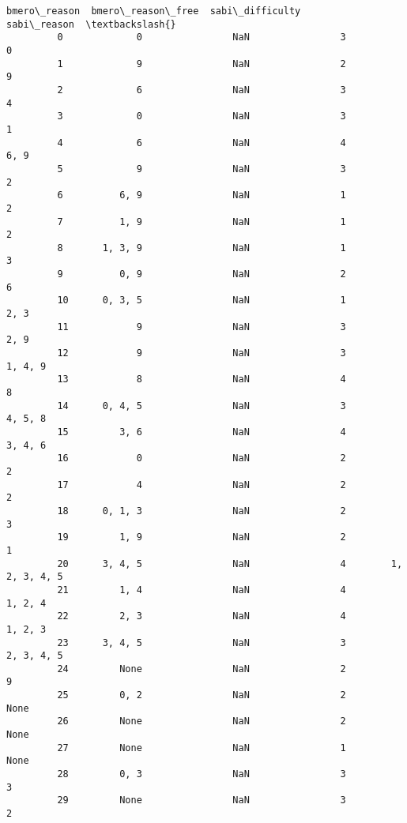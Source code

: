 \documentclass[11pt]{article}
\begin{document}
\begin{Verbatim}[commandchars=\\\{\}]
            bmero\_reason  bmero\_reason\_free  sabi\_difficulty          sabi\_reason  \textbackslash{}
         0             0                NaN                3                    0   
         1             9                NaN                2                    9   
         2             6                NaN                3                    4   
         3             0                NaN                3                    1   
         4             6                NaN                4                 6, 9   
         5             9                NaN                3                    2   
         6          6, 9                NaN                1                    2   
         7          1, 9                NaN                1                    2   
         8       1, 3, 9                NaN                1                    3   
         9          0, 9                NaN                2                    6   
         10      0, 3, 5                NaN                1                 2, 3   
         11            9                NaN                3                 2, 9   
         12            9                NaN                3              1, 4, 9   
         13            8                NaN                4                    8   
         14      0, 4, 5                NaN                3              4, 5, 8   
         15         3, 6                NaN                4              3, 4, 6   
         16            0                NaN                2                    2   
         17            4                NaN                2                    2   
         18      0, 1, 3                NaN                2                    3   
         19         1, 9                NaN                2                    1   
         20      3, 4, 5                NaN                4        1, 2, 3, 4, 5   
         21         1, 4                NaN                4              1, 2, 4   
         22         2, 3                NaN                4              1, 2, 3   
         23      3, 4, 5                NaN                3           2, 3, 4, 5   
         24         None                NaN                2                    9   
         25         0, 2                NaN                2                 None   
         26         None                NaN                2                 None   
         27         None                NaN                1                 None   
         28         0, 3                NaN                3                    3   
         29         None                NaN                3                    2   

\end{Verbatim}
\end{document}
